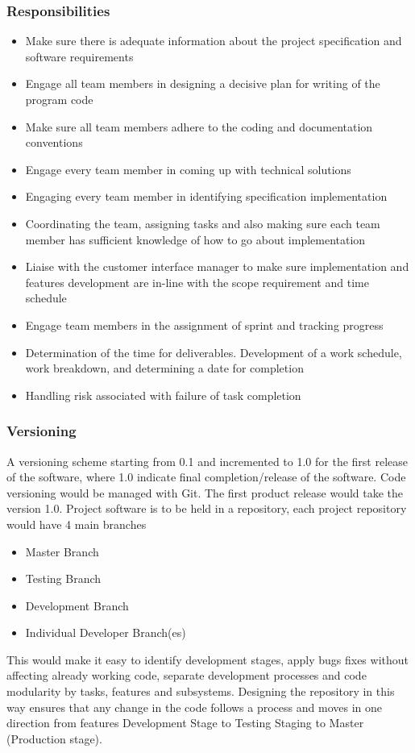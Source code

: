 \documentclass{article}
\begin{document}
\subsubsection{Responsibilities}
\begin{itemize}
\item
Make sure there is adequate information about the project specification and software requirements
\item
Engage all team members in designing a decisive plan for writing of the program code
\item
Make sure all team members adhere to the coding and documentation conventions \cite{bobs3cs}
\item
Engage every team member in coming up with technical solutions
\item
Engaging every team member in identifying specification implementation
\item
Coordinating the team, assigning tasks and also making sure each team member has sufficient knowledge of how to go about implementation
\item
Liaise with the customer interface manager to make sure implementation and features development are in-line with the scope requirement and time schedule
\item
Engage team members in the assignment of sprint and tracking progress
\item
Determination of the time for deliverables. Development of a work schedule, work breakdown, and determining a date for completion
\item
Handling risk associated with failure of task completion
\end{itemize}
\subsubsection{Versioning}
A versioning scheme starting from 0.1 and incremented to 1.0 for the first release of the software, where 1.0 indicate final completion/release of the software. Code versioning would be managed with Git. The first product release would take the version 1.0. Project software is to be held in a repository, each project repository would have 4 main branches
\begin{itemize}
\item
Master Branch
\item
Testing Branch
\item
Development Branch
\item
Individual Developer Branch(es)
\end{itemize}
This would make it easy to identify development stages, apply bugs fixes without affecting already working code, separate development processes and code modularity by tasks, features and subsystems. Designing the repository in this way ensures that any change in the code follows a process and moves in one direction from features Development Stage to Testing Staging to Master (Production stage).
\end{document}
